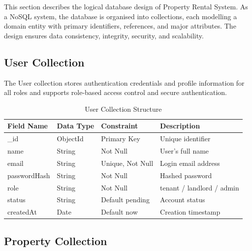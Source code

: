 This section describes the logical database design of Property Rental System. As a NoSQL system, the database is organised into collections, each modelling a domain entity with primary identifiers, references, and major attributes. The design ensures data consistency, integrity, security, and scalability.

\subsection{User Collection}

The User collection stores authentication credentials and profile information for all roles and supports role-based access control and secure authentication.

\begin{table}[h]
\centering
\caption{User Collection Structure}

\begin{tabularx}{\textwidth}{|>{\raggedright\arraybackslash}p{3cm}|>{\raggedright\arraybackslash}p{3cm}|>{\raggedright\arraybackslash}p{3cm}|X|}
\hline
\textbf{Field Name} & \textbf{Data Type} & \textbf{Constraint} & \textbf{Description} \\
\hline
\_id & ObjectId & Primary Key & Unique identifier \\
\hline
name & String & Not Null & User's full name \\
\hline
email & String & Unique, Not Null & Login email address \\
\hline
passwordHash & String & Not Null & Hashed password \\
\hline
role & String & Not Null & tenant / landlord / admin \\
\hline
status & String & Default pending & Account status \\
\hline
createdAt & Date & Default now & Creation timestamp \\
\hline
\end{tabularx}

\end{table}

\subsection{Property Collection}

